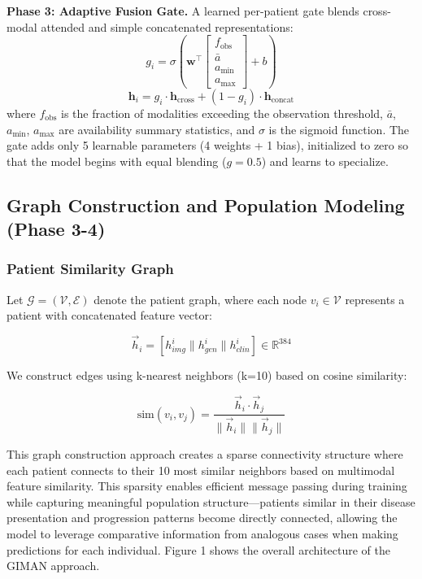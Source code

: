 \documentclass[journal,twoside,web]{ieeecolor}
\begin{document}
\textbf{Phase 3: Adaptive Fusion Gate.} A learned per-patient gate blends cross-modal attended and simple concatenated representations:
\begin{equation}
g_i = \sigma\left(\mathbf{w}^\top \begin{bmatrix} f_{\text{obs}} \\ \bar{a} \\ a_{\min} \\ a_{\max} \end{bmatrix} + b\right)
\end{equation}
\begin{equation}
\mathbf{h}_i = g_i \cdot \mathbf{h}_{\text{cross}} + (1 - g_i) \cdot \mathbf{h}_{\text{concat}}
\end{equation}
where $f_{\text{obs}}$ is the fraction of modalities exceeding the observation threshold, $\bar{a}$, $a_{\min}$, $a_{\max}$ are availability summary statistics, and $\sigma$ is the sigmoid function. The gate adds only 5 learnable parameters (4 weights + 1 bias), initialized to zero so that the model begins with equal blending ($g=0.5$) and learns to specialize.

\subsection{Graph Construction and Population Modeling (Phase 3-4)}

\subsubsection{Patient Similarity Graph}
Let $\mathcal{G} = (\mathcal{V}, \mathcal{E})$ denote the patient graph, where each node $v_i \in \mathcal{V}$ represents a patient with concatenated feature vector:

\begin{equation}
\vec{h}_i = [h_{img}^i \| h_{gen}^i \| h_{clin}^i] \in \mathbb{R}^{384}
\end{equation}

We construct edges using k-nearest neighbors (k=10) based on cosine similarity:

\begin{equation}
\text{sim}(v_i, v_j) = \frac{\vec{h}_i \cdot \vec{h}_j}{\|\vec{h}_i\| \|\vec{h}_j\|}
\end{equation}

This graph construction approach creates a sparse connectivity structure where each patient connects to their 10 most similar neighbors based on multimodal feature similarity. This sparsity enables efficient message passing during training while capturing meaningful population structure---patients similar in their disease presentation and progression patterns become directly connected, allowing the model to leverage comparative information from analogous cases when making predictions for each individual. Figure 1 shows the overall architecture of the GIMAN approach.
\end{document}
